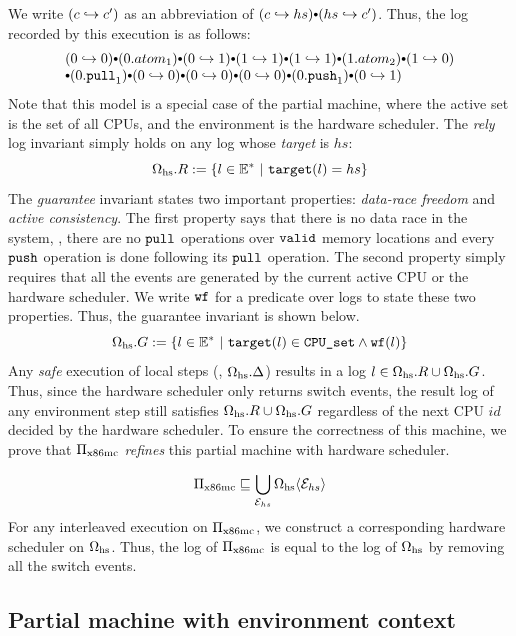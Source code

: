 \noindent
We write $(c \hookrightarrow c')$
as an abbreviation of $(c \switch hs) \cons (hs \switch c')$.
Thus,
the log recorded by this execution is as follows:
\[
\begin{array}{l}
(0\switch 0) \cons (0.atom_1)
\cons (0\switch 1) \cons (1\switch 1)
\cons  (1\switch 1) \cons (1.atom_2)
\cons (1\switch 0) \\
\cons (0.\pull_1) 
\cons (0\switch 0)
\cons (0\switch 0)
\cons (0\switch 0)
\cons (0.\push_1) 
\cons ( 0\switch 1)
\end{array}
\]
\noindent
Note that this model is a special case of the partial
machine,
where the 
active set is the set of all CPUs,
and the environment is the hardware scheduler.
The \emph{rely} log invariant simply holds
on any log whose \emph{target} is $hs$:
\[\pmach{hs}.R := \{ l \in \Ev^* \ |\ \kw{target}(l) = hs \}\]
The \emph{guarantee} invariant states
two important properties:
\emph{data-race freedom}
and \emph{active consistency}.
The first property says
 that there is no
data race in the system,
\ie, there are no ${\texttt{pull}}$ operations over ${\texttt{valid}}$
memory locations and every ${\texttt{push}}$ operation
is done following its ${\texttt{pull}}$ operation.
The second property simply
requires that all the events
are generated by the current active CPU or the hardware scheduler.
We write ${\texttt{wf}}$ for a predicate
over logs to state these two properties.
Thus, the guarantee invariant is shown below.
\[\pmach{hs}.G := \{ l \in \Ev^* \ |\ \kw{target}(l) \in \code{CPU\_set}
\land \code{wf}(l) \}\]
Any \emph{safe} execution of  local steps (\ie, $\Omega_{\text{hs}}.\Delta$) results in a log $l \in \Omega_{\text{hs}}.R \cup \Omega_{\text{hs}}.G$.
Thus, since the hardware scheduler only returns switch events,
the result log of any environment step still satisfies
$\Omega_{\text{hs}}.R \cup \Omega_{\text{hs}}.G$ regardless
of the next CPU $id$ decided by the hardware scheduler.
To ensure the correctness of this machine,
we prove that $\Pi_{\text{x86mc}}$ \emph{refines} this
partial machine with hardware scheduler.

\begin{lemma}
\[\Pi_{\text{x86mc}} \sqsubseteq \bigcup_{\mathcal{E}_{hs}}{
\Omega_{\text{hs}}\langle \mathcal{E}_{hs} \rangle}
\]
For any interleaved execution on $\Pi_{\text{x86mc}}$, we construct
a corresponding hardware scheduler on $\Omega_{\text{hs}}$.
Thus, the log of $\Pi_{\text{x86mc}}$
is equal to the log of $\Omega_{\text{hs}}$
by removing all the switch events.
 \label{lemma:pboot}
\end{lemma}


\subsection{Partial machine with environment context}


